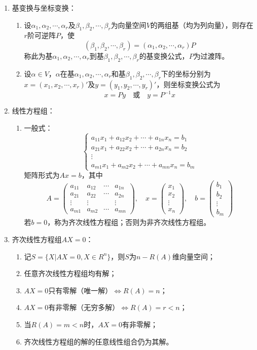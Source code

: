 \documentclass[UTF8]{ctexart}
\theoremstyle{remark}
\begin{document}
\begin{enumerate}
\item 基变换与坐标变换：
\begin{enumerate}
	\item 设$\alpha_1,\alpha_2,\cdots,\alpha_r$及$\beta_1,\beta_2,\cdots,\beta_r$为向量空间$V$的两组基（均为列向量），则存在$r$阶可逆阵$P$，使
	\[
	(\beta_1,\beta_2,\cdots,\beta_r)=(\alpha_1,\alpha_2,\cdots,\alpha_r)P
	\]
	称此为基$\alpha_1,\alpha_2,\cdots,\alpha_r$到基$\beta_1,\beta_2,\cdots,\beta_r$的基变换公式，$P$为过渡阵。
	\item 设$\alpha\in V$，$\alpha$在基$\alpha_1,\alpha_2,\cdots,\alpha_r$和基$\beta_1,\beta_2,\cdots,\beta_r$下的坐标分别为$x=(x_1,x_2,\cdots,x_r)'$及$y=(y_1,y_2,\cdots,y_r)'$，则坐标变换公式为
	\[
	x=Py \quad 或 \quad y=P^{-1}x
	\]
\end{enumerate}

\item 线性方程组：
\begin{enumerate}
	\item 一般式：
	\[
	\begin{cases}
		a_{11}x_1+a_{12}x_2+\cdots+a_{1n}x_n=b_1 \\
		a_{21}x_1+a_{22}x_2+\cdots+a_{2n}x_n=b_2 \\
		\vdots \\
		a_{m1}x_1+a_{m2}x_2+\cdots+a_{mn}x_n=b_m
	\end{cases}
	\]
	矩阵形式为$Ax=b$，其中
	\[
	A=\begin{pmatrix}
		a_{11} & a_{12} & \cdots & a_{1n} \\
		a_{21} & a_{22} & \cdots & a_{2n} \\
		\vdots & \vdots & & \vdots \\
		a_{m1} & a_{m2} & \cdots & a_{mn}
	\end{pmatrix}, \quad x=\begin{pmatrix}
		x_1 \\
		x_2 \\
		\vdots \\
		x_n
	\end{pmatrix}, \quad b=\begin{pmatrix}
		b_1 \\
		b_2 \\
		\vdots \\
		b_m
	\end{pmatrix}
	\]
	若$b=0$，称为齐次线性方程组；否则为非齐次线性方程组。
\end{enumerate}

\item 齐次线性方程组$AX=0$：
\begin{enumerate}
	\item 记$S=\{X|AX=0,X\in R^n\}$，则$S$为$n-R(A)$维向量空间；
	\item 任意齐次线性方程组均有解；
	\item $AX=0$只有零解（唯一解）$\Leftrightarrow R(A)=n$；
	\item $AX=0$有非零解（无穷多解）$\Leftrightarrow R(A)=r<n$；
	\item 当$R(A)=m<n$时，$AX=0$有非零解；
	\item 齐次线性方程组的解的任意线性组合仍为其解。
\end{enumerate}


\end{enumerate}
\end{document}
